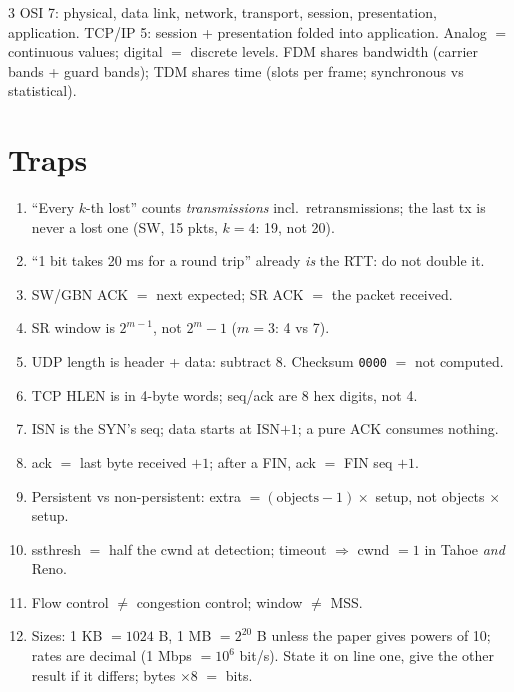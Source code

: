 \begin{multicols*}{3}
 
OSI 7: physical, data link, network, transport, session, presentation, application. TCP/IP 5: session + presentation folded into application.
Analog $=$ continuous values; digital $=$ discrete levels. FDM shares bandwidth (carrier bands + guard bands); TDM shares time (slots per frame; synchronous vs statistical).

\section*{Traps}
\begin{enumerate}
  \item ``Every $k$-th lost'' counts \emph{transmissions} incl.\ retransmissions; the last tx is never a lost one (SW, 15 pkts, $k=4$: 19, not 20).
  \item ``1 bit takes 20 ms for a round trip'' already \emph{is} the RTT: do not double it.
  \item SW/GBN ACK $=$ next expected; SR ACK $=$ the packet received.
  \item SR window is $2^{m-1}$, not $2^m-1$ ($m=3$: 4 vs 7).
  \item UDP length is header + data: subtract 8. Checksum \texttt{0000} $=$ not computed.
  \item TCP HLEN is in 4-byte words; seq/ack are 8 hex digits, not 4.
  \item ISN is the SYN's seq; data starts at ISN$+1$; a pure ACK consumes nothing.
  \item ack $=$ last byte received $+1$; after a FIN, ack $=$ FIN seq $+1$.
  \item Persistent vs non-persistent: extra $=(\text{objects}-1)\times$ setup, not objects $\times$ setup.
  \item ssthresh $=$ half the cwnd at detection; timeout $\Rightarrow$ cwnd $=1$ in Tahoe \emph{and} Reno.
  \item Flow control $\ne$ congestion control; window $\ne$ MSS.
  \item Sizes: 1 KB $=1024$ B, 1 MB $=2^{20}$ B unless the paper gives powers of 10; rates are decimal (1 Mbps $=10^6$ bit/s). State it on line one, give the other result if it differs; bytes $\times8$ $=$ bits.
\end{enumerate}


\end{multicols*}
